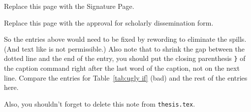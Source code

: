 \documentclass{LA_Tech}
\begin{document}
	\hypersetup{pageanchor=false}
	
	\thispagestyle{empty}
	
	\maketitle
	
	\thispagestyle{empty}
	Replace this page with the Signature Page.
	
	\hypersetup{pageanchor=true}
	
	\setcounter{page}{1}	
	
	
	\thispagestyle{empty}
	Replace this page with the approval for
	scholarly dissemination form.
	
	
	
	\tableofcontentstech
	\listoftablestech  %
	
	\begin{singlespace}
		\vspace{12pt}
		\noindent So the entries above would need to be fixed by rewording to eliminate the spills.
		(And text like is not permissible.)
		Also note that to shrink the gap between the dotted line and the end of the entry, you should put the closing parenthesis \verb+}+ of the caption command right after the last word of the caption, not on the next line.
		Compare the entries for	Table~\ref{tab:ugly if} (bad) and the rest of the entries here.
		
		\vspace{\baselineskip}
		\noindent Also, you shouldn't forget to delete this note from \verb+thesis.tex+.
	\end{singlespace}
	
	\listoffigurestech %
	
		
	
	
	
	
	
	
	
	
\end{document}
